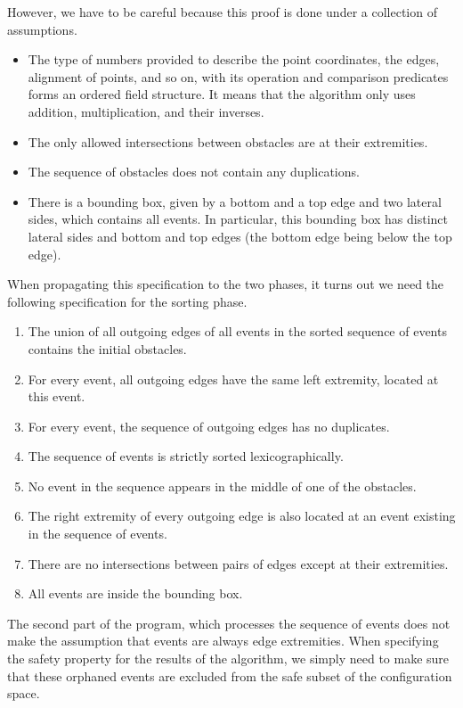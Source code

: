 \documentclass[a4paper, USenglish, cleveref, autoref, thm-restate, final]{lipics-v2021}
\begin{document}
However, we have to be careful because this proof is done under a
collection of assumptions.
\begin{itemize}
\item The type of numbers provided to describe the point coordinates,
  the edges, alignment of points, and so on, with its operation and
  comparison predicates forms an ordered field structure.  It means that the
  algorithm only uses addition, multiplication, and their inverses.
\item The only allowed intersections between obstacles are at their
  extremities.
\item The sequence of obstacles does not contain any duplications.
\item There is a bounding box, given by a bottom and a top edge and two
  lateral sides, which contains all events.  In particular, this bounding box
  has distinct lateral sides and bottom and top edges (the bottom edge being
  below the top edge).
\end{itemize}
When propagating this specification to the two phases, it turns out we
need the following specification for the sorting phase.
\begin{enumerate}
\item The union of all outgoing edges of all events in the sorted
  sequence of events contains the initial obstacles.
\item For every event, all outgoing edges have the same left
  extremity, located at this event.
\item For every event, the sequence of outgoing edges has no duplicates.
\item The sequence of events is strictly sorted lexicographically.
\item No event in the sequence appears in the middle of one of the
  obstacles.
\item The right extremity of every outgoing edge is also located at an
  event existing in the sequence of events.
\item There are no intersections between pairs of edges except at their
  extremities.
\item All events are inside the bounding box.
\end{enumerate}
The second part of the program, which processes the sequence of events
does not make the assumption that events are always edge extremities.
When specifying the safety
property for the results of the algorithm, we simply need to make sure
that these orphaned events are excluded from the safe subset of the
configuration space.
\end{document}
